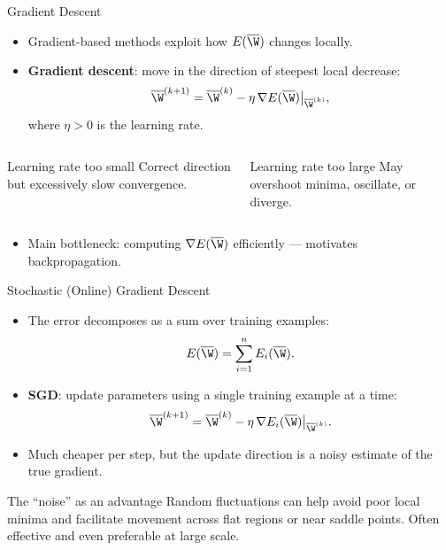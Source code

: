 \begin{frame}{Gradient Descent}
  \begin{itemize}
    \item Gradient-based methods exploit how $E(\overline{\W})$ changes locally.
    \item \textbf{Gradient descent}: move in the direction of \alert{steepest local decrease}:
    \[
      \overline{\W}^{(k+1)} = \overline{\W}^{(k)} - \eta\,\nabla E(\overline{\W})\big|_{\overline{\W}^{(k)}},
    \]
    where $\eta > 0$ is the \alert{learning rate}.
  \end{itemize}
  \begin{columns}[t]
      \begin{block}{Learning rate too small}
        Correct direction but \alert{excessively slow} convergence.
      \end{block}
      \begin{alertblock}{Learning rate too large}
        May \alert{overshoot} minima, oscillate, or diverge.
      \end{alertblock}
  \end{columns}
  \medskip
  \begin{itemize}
    \item Main bottleneck: computing $\nabla E(\overline{\W})$ efficiently — motivates \alert{backpropagation}.
  \end{itemize}
\end{frame}

\begin{frame}{Stochastic (Online) Gradient Descent}
  \begin{itemize}
    \item The error decomposes as a sum over training examples:
    \[
      E(\overline{\W}) = \sum_{i=1}^{n} E_i(\overline{\W}).
    \]
    \item \textbf{SGD}: update parameters using a \alert{single training example} at a time:
    \[
      \overline{\W}^{(k+1)} = \overline{\W}^{(k)} - \eta\,\nabla E_i(\overline{\W})\big|_{\overline{\W}^{(k)}}.
    \]
    \item Much cheaper per step, but the update direction is a \alert{noisy estimate} of the true gradient.
  \end{itemize}
  \begin{block}{The ``noise'' as an advantage}
    Random fluctuations can help avoid poor local minima and facilitate movement across flat
    regions or near saddle points. Often effective and even preferable at large scale.
  \end{block}
\end{frame}

